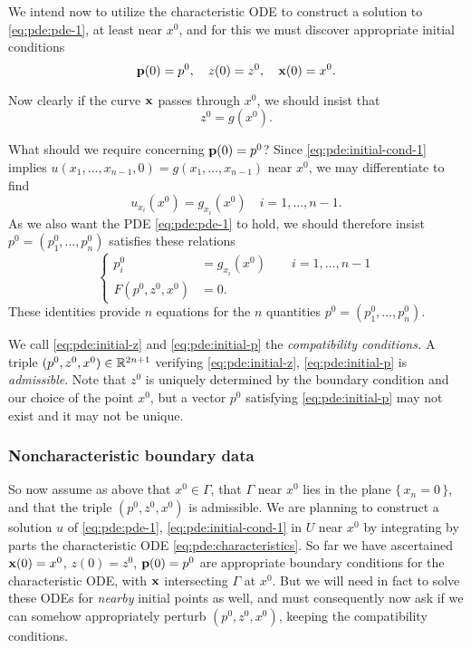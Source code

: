 We intend now to utilize the characteristic ODE to construct a solution to
\eqref{eq:pde:pde-1}, at least near \(x^0\), and for this we must discover
appropriate initial conditions
\begin{equation}
  \label{eq:pde:initial-conds-2}
  \mathbf{p}(0)=p^0,\quad
  z(0)=z^0,\quad
  \mathbf{x}(0)=x^0.
\end{equation}

Now clearly if the curve \(\mathbf{x}\) passes through \(x^0\), we should insist
that
\begin{equation}
  \label{eq:pde:initial-z}
  z^0=g(x^0).
\end{equation}

What should we require concerning \(\mathbf{p}(0)=p^0\)? Since
\eqref{eq:pde:initial-cond-1} implies
\(u(x_1,\dotsc,x_{n-1},0)=g(x_1,\dotsc,x_{n-1})\) near \(x^0\), we may
differentiate to find
\[
  u_{x_i}(x^0)=g_{x_i}(x^0)\quad \text{\(i=1,\dotsc,n-1\).}
\]
As we also want the PDE \eqref{eq:pde:pde-1} to hold, we should therefore
insist \(p^0=(p_1^0,\dotsc,p_n^0)\) satisfies these relations
\begin{equation}
  \label{eq:pde:initial-p}
  \left\{
    \begin{aligned}
      p_i^0&=g_{x_i}(x^0)\qquad\text{\(i=1,\dotsc,n-1\)}\\
      F(p^0,z^0,x^0)&=0.
    \end{aligned}
  \right.
\end{equation}
These identities provide \(n\) equations for the \(n\) quantities
\(p^0=(p_1^0,\dotsc,p_n^0)\).

We call \eqref{eq:pde:initial-z} and \eqref{eq:pde:initial-p} the
\emph{compatibility conditions.} A triple \((p^0,z^0,x^0)\in\mathbb{R}^{2n+1}\)
verifying \eqref{eq:pde:initial-z}, \eqref{eq:pde:initial-p} is
\emph{admissible}. Note that \(z^0\) is uniquely determined by the boundary
condition and our choice of the point \(x^0\), but a vector \(p^0\)
satisfying \eqref{eq:pde:initial-p} may not exist and it may not be
unique.

\subsubsection{Noncharacteristic boundary data}
So now assume as above that \(x^0\in\Gamma\), that \(\Gamma\) near \(x^0\)
lies in the plane \(\{\,x_n=0\,\}\), and that the triple \((p^0,z^0,x^0)\)
is admissible. We are planning to construct a solution \(u\) of
\eqref{eq:pde:pde-1}, \eqref{eq:pde:initial-cond-1} in \(U\) near \(x^0\)
by integrating by parts the characteristic ODE
\eqref{eq:pde:characteristics}. So far we have ascertained \(\mathbf{x}(0)=x^0\),
\(z(0)=z^0\), \(\mathbf{p}(0)=p^0\) are appropriate boundary conditions for the
characteristic ODE, with \(\mathbf{x}\) intersecting \(\Gamma\) at \(x^0\). But
we will need in fact to solve these ODEs for \emph{nearby} initial points
as well, and must consequently now ask if we can somehow appropriately
perturb \((p^0,z^0,x^0)\), keeping the compatibility conditions.

